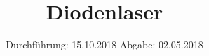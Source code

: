 

\subject{VERSUCH NUMMER 60}
\title{Diodenlaser}
\date{
  Durchführung: 15.10.2018
  \hspace{3em}
  Abgabe: 02.05.2018
}



\thispagestyle{empty}
\maketitle
\thispagestyle{empty}
\tableofcontents
\newpage
\setcounter{page}{1}


% 




\nocite{*}
\printbibliography


